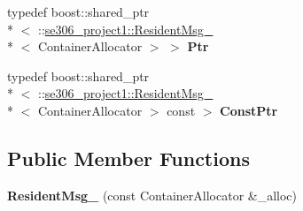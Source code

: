 \begin{DoxyCompactItemize}
\item 
\hypertarget{structse306__project1_1_1ResidentMsg___ab2377a7f29370a11badbb8469ab8b811}{typedef boost\-::shared\-\_\-ptr\\*
$<$ \-::\hyperlink{structse306__project1_1_1ResidentMsg__}{se306\-\_\-project1\-::\-Resident\-Msg\-\_\-}\\*
$<$ Container\-Allocator $>$ $>$ {\bfseries Ptr}}\label{structse306__project1_1_1ResidentMsg___ab2377a7f29370a11badbb8469ab8b811}

\item 
\hypertarget{structse306__project1_1_1ResidentMsg___a303bbdaa992130e86797f04c3754c962}{typedef boost\-::shared\-\_\-ptr\\*
$<$ \-::\hyperlink{structse306__project1_1_1ResidentMsg__}{se306\-\_\-project1\-::\-Resident\-Msg\-\_\-}\\*
$<$ Container\-Allocator $>$ const  $>$ {\bfseries Const\-Ptr}}\label{structse306__project1_1_1ResidentMsg___a303bbdaa992130e86797f04c3754c962}

\end{DoxyCompactItemize}
\subsection*{Public Member Functions}
\begin{DoxyCompactItemize}
\item 
\hypertarget{structse306__project1_1_1ResidentMsg___acd6d23f75b6ac337376a428469ba11f3}{{\bfseries Resident\-Msg\-\_\-} (const Container\-Allocator \&\-\_\-alloc)}\label{structse306__project1_1_1ResidentMsg___acd6d23f75b6ac337376a428469ba11f3}

\end{DoxyCompactItemize}
